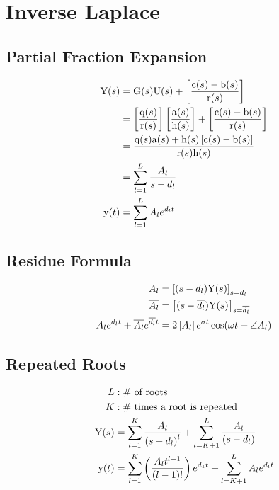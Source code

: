 \section*{Inverse Laplace}
\subsection*{Partial Fraction Expansion}
\begin{align*}
    \func{Y}[s] &= \func{G}[s]\func{U}[s]+\left[\frac{\func{c}[s]-\func{b}[s]}{\func{r}[s]}\right] \\
                &= \left[\frac{\func{q}[s]}{\func{r}[s]}\right]\left[\frac{\func{a}[s]}{\func{h}[s]}\right]+\left[\frac{\func{c}[s]-\func{b}[s]}{\func{r}[s]}\right] \\
                &= \frac{\func{q}[s]\func{a}[s]+\func{h}[s]\left[\func{c}[s]-\func{b}[s]\right]}{\func{r}[s]\func{h}[s]} \\
                &= \sum_{l=1}^{L}\frac{A_l}{s-d_l} \\
    \func{y}[t] &= \sum_{l=1}^{L}A_l e^{d_l t}
\end{align*}

\subsection*{Residue Formula}
\begin{align*}
    A_l &= {\left[(s-d_l)\func{Y}[s]\right]}_{s=d_l} \\
    \overline{A_l} &= {\left[(s-\overline{d_l})\func{Y}[s]\right]}_{s=\overline{d_l}} \\
    A_l e^{d_l t} + \overline{A_l} e^{\overline{d_l} t} &= 2 \left|A_l\right| e^{\sigma t} \cos{\omega t + \angle A_l}
\end{align*}

\subsection*{Repeated Roots}
\begin{align*}
    L &: \text{\# of roots} \\
    K &: \text{\# times a root is repeated} \\
    \func{Y}[s] &= \sum_{l=1}^{K} \frac{A_l}{{(s-d_l)}^l}+\sum_{l=K+1}^{L}\frac{A_l}{(s-d_l)} \\
    \func{y}[t] &= \sum_{l=1}^{K}\left(\frac{A_l t^{l-1}}{(l-1)!}\right)e^{d_1 t} + \sum_{l=K+1}^{L}A_l e^{d_l t}
\end{align*}